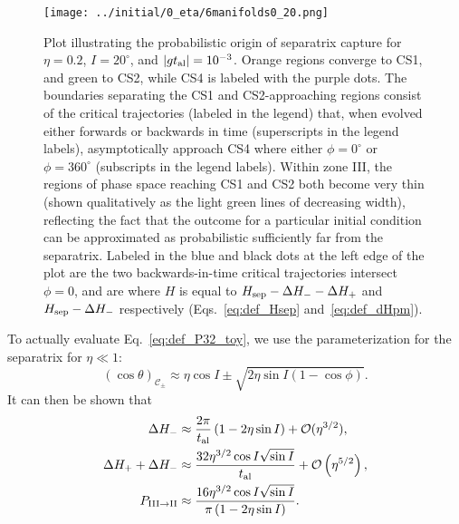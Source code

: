 \documentclass[
        fleqn,
        usenatbib,
    ]{mnras}
\newcommand*{\abs}[1]{\left|#1\right|}
\newcommand*{\p}[1]{\left(#1\right)}
\begin{document}
\begin{figure}
    \centering
    \texttt{[image: ../initial/0\_eta/6manifolds0\_20.png]}
    \caption{Plot illustrating the probabilistic origin of separatrix capture
    for $\eta = 0.2$, $I = 20^\circ$, and $\abs{gt_{\rm al}} = 10^{-3}$. Orange
    regions converge to CS1, and green to CS2, while CS4 is labeled with the
    purple dots. The boundaries separating the CS1 and CS2-approaching regions
    consist of the critical trajectories (labeled in the legend) that, when
    evolved either forwards or backwards in time (superscripts in the legend
    labels), asymptotically approach CS4 where either $\phi = 0^\circ$ or $\phi
    = 360^\circ$ (subscripts in the legend labels). Within zone III, the regions
    of phase space reaching CS1 and CS2 both become very thin (shown
    qualitatively as the light green lines of decreasing width), reflecting the
    fact that the outcome for a particular initial condition can be approximated
    as probabilistic sufficiently far from the separatrix. Labeled in the blue
    and black dots at the left edge of the plot are the two backwards-in-time
    critical trajectories intersect $\phi = 0$, and are where $H$ is equal to
    $H_{\rm sep} - \Delta H_- - \Delta H_+$ and $H_{\rm sep} - \Delta H_-$
    respectively (Eqs.~\ref{eq:def_Hsep} and~\ref{eq:def_dHpm}).
    }\label{fig:toy_hop_manifolds}
\end{figure}

To actually evaluate Eq.~\eqref{eq:def_P32_toy}, we use the parameterization for
the separatrix \citep{su2020} for $\eta \ll 1$:
\begin{equation}
    \p{\cos \theta}_{\mathcal{C}_{\pm}} \approx
        \eta \cos I \pm \sqrt{2\eta\sin I\p{1 - \cos \phi}}.
        \label{eq:sep_theta}
\end{equation}
It can then be shown that
\begin{align}
    \Delta H_- &\approx \frac{2\pi}{t_{\rm al}}\p{1
        - 2\eta \sin I} + \mathcal{O}(\eta^{3/2}),\\
    \Delta H_+ + \Delta H_- &\approx
        \frac{32 \eta^{3/2}\cos I \sqrt{\sin I}}{t_{\rm al}}
            + \mathcal{O}\p{\eta^{5/2}},\\
    P_{\rm III \to II} &\approx
        \frac{16 \eta^{3/2} \cos I \sqrt{\sin I}}{\pi
            \p{1  - 2\eta \sin I}}.\label{eq:P32_toy}
\end{align}
\end{document}
